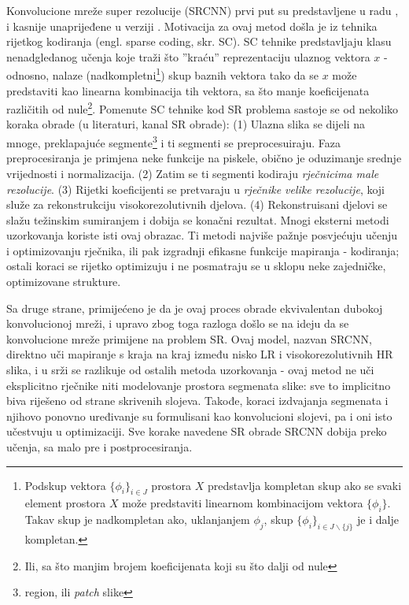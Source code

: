 \documentclass[12pt]{report}
\numberwithin{equation}{section}
\begin{document}

Konvolucione mreže super rezolucije (SRCNN) prvi put su predstavljene u radu \cite{earlier}, i kasnije unaprijeđene u verziji \cite{main}. Motivacija za ovaj metod došla je iz tehnika rijetkog kodiranja (engl. sparse coding, skr. SC). SC tehnike \cite{sparse} predstavljaju klasu nenadgledanog učenja koje traži što ''kraću'' reprezentaciju ulaznog vektora $x$ - odnosno, nalaze (nadkompletni\footnote{Podskup vektora $\{\phi_{i}\}_{i\in J}$ prostora $X$ predstavlja kompletan skup ako se svaki element prostora $X$ može predstaviti linearnom kombinacijom vektora $\{\phi _{i}\}$. Takav skup je nadkompletan ako, uklanjanjem $\phi_{j}$, skup $\{\phi _{i}\}_{{i\in J\backslash \{j\}}}$ je i dalje kompletan.}) skup baznih vektora tako da se $x$ može predstaviti kao linearna kombinacija tih vektora, sa što manje koeficijenata različitih od nule\footnote{Ili, sa što manjim brojem koeficijenata koji su što dalji od nule}. Pomenute SC tehnike kod SR problema \cite{sparse1} sastoje se od nekoliko koraka obrade (u literaturi, kanal SR obrade): (1) Ulazna slika se dijeli na mnoge, preklapajuće segmente\footnote{region, ili \textit{patch} slike} i ti segmenti se preprocesuiraju. Faza preprocesiranja je primjena neke funkcije na piskele, obično je oduzimanje srednje vrijednosti i normalizacija. (2) Zatim se ti segmenti kodiraju \textit{rječnicima male rezolucije}. (3) Rijetki koeficijenti se pretvaraju u \textit{rječnike velike rezolucije}, koji služe za rekonstrukciju visokorezolutivnih djelova. (4) Rekonstruisani djelovi se slažu težinskim sumiranjem i dobija se konačni rezultat. Mnogi eksterni metodi uzorkovanja koriste isti ovaj obrazac. Ti metodi najviše pažnje posvjećuju učenju i optimizovanju rječnika, ili pak izgradnji efikasne funkcije mapiranja - kodiranja; ostali koraci se rijetko optimizuju i ne posmatraju se u sklopu neke zajedničke, optimizovane strukture.  


Sa druge strane, primijećeno je da je ovaj proces obrade ekvivalentan dubokoj konvolucionoj mreži, i upravo zbog toga razloga došlo se na ideju da se konvolucione mreže primijene na problem SR. Ovaj model, nazvan SRCNN, direktno uči mapiranje s kraja na kraj između nisko LR i visokorezolutivnih HR slika, i u srži se razlikuje od ostalih metoda uzorkovanja - ovaj metod ne uči eksplicitno rječnike niti modelovanje prostora segmenata slike: sve to implicitno biva riješeno od strane skrivenih slojeva. Takođe, koraci izdvajanja segmenata i njihovo ponovno uređivanje su formulisani kao konvolucioni slojevi, pa i oni isto učestvuju u optimizaciji. Sve korake navedene SR obrade SRCNN dobija preko učenja, sa malo pre i postprocesiranja. 
\end{document}
